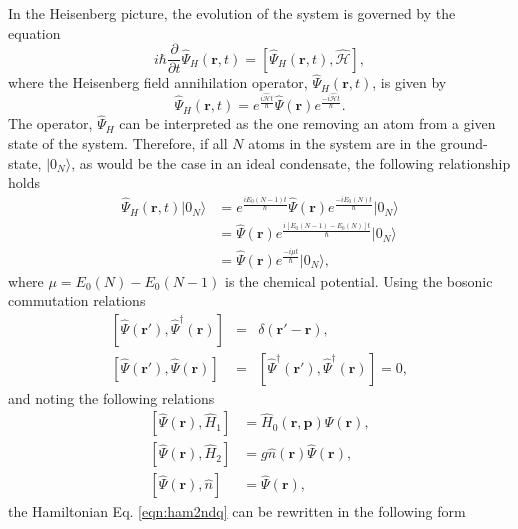 In the Heisenberg picture, the evolution of the system is governed by the equation
\begin{equation}\label{eqn:heisenberg}
i\hbar \frac{\partial}{\partial t}\hat{\Psi}_H\left(\textbf{r}, t\right) = \left[\hat{\Psi}_{H}\left(\textbf{r}, t\right), \hat{\mathcal{H}}  \right],
\end{equation}
where the Heisenberg field annihilation operator, $\hat{\Psi}_H\left(\textbf{r}, t\right)$, is given by
\begin{equation}\label{eqn:psi_heisenberg}
\hat{\Psi}_H\left(\textbf{r}, {t} \right) = e^{\frac{i\hat{\mathcal{H}}t}{\hbar}}\hat{\Psi}\left(\textbf{r}\right) e^{\frac{-i\hat{\mathcal{H}}t}{\hbar}}.
\end{equation}
The operator, $\hat{\Psi}_H$ can be interpreted as the one removing an atom from a given state of the system. Therefore, if all $N$ atoms in the system are in the ground-state, $\vert 0_N\rangle$, as would be the case in an ideal condensate, the following relationship holds
\begin{align}
\hat{\Psi}_{H}(\textbf{r},t)\vert 0_N \rangle &= e^{\frac{iE_0(N-1)t}{\hbar}}\hat{\Psi}(\textbf{r})e^{\frac{-iE_0(N)t}{\hbar}}\vert 0_N \rangle \\
&= \hat{\Psi}(\textbf{r})e^{\frac{i[E_0(N-1) - E_0(N)]t}{\hbar}} \vert 0_N \rangle \\
&= \hat{\Psi}(\textbf{r})e^{\frac{-i\mu t}{\hbar}} \vert 0_N \rangle, \label{eqn:stationary_soln}
\end{align}
where $\mu=E_0(N) - E_0(N-1)$ is the chemical potential. Using the bosonic commutation relations
\begin{eqnarray}
\left[\hat{\Psi}(\textbf{r}'), \hat{\Psi}^{\dagger}(\textbf{r})\right] &=& \delta(\textbf{r}' - \textbf{r}), \\
\left[\hat{\Psi}(\textbf{r}'), \hat{\Psi}(\textbf{r})\right] &=& \left[\hat{\Psi}^{\dagger}(\textbf{r}'), \hat{\Psi}^{\dagger}(\textbf{r})\right] = 0,
\end{eqnarray}
and noting the following relations
\begin{align}
\left[\hat{\Psi}(\textbf{r}),\hat{H}_1 \right] & = \hat{H}_0(\textbf{r},\textbf{p})\hat{\Psi}(\textbf{r}), \\
\left[\hat{\Psi}(\textbf{r}),\hat{H}_2 \right] & = g\hat{n}(\textbf{r})\hat{\Psi}(\textbf{r}), \\
\left[\hat{\Psi}(\textbf{r}),\hat{n} \right] & = \hat{\Psi}(\textbf{r}) ,
\end{align}
the Hamiltonian Eq. \eqref{eqn:ham2ndq} can be rewritten in the following form

